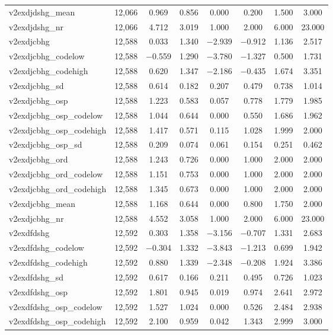 \begin{table}[!htbp]
\begin{tabular}{@{\extracolsep{5pt}}lccccccc}
v2exdjdshg\_mean & 12,066 & 0.969 & 0.856 & 0.000 & 0.200 & 1.500 & 3.000 \\ 
v2exdjdshg\_nr & 12,066 & 4.712 & 3.019 & 1.000 & 2.000 & 6.000 & 23.000 \\ 
v2exdjcbhg & 12,588 & 0.033 & 1.340 & $-$2.939 & $-$0.912 & 1.136 & 2.517 \\ 
v2exdjcbhg\_codelow & 12,588 & $-$0.559 & 1.290 & $-$3.780 & $-$1.327 & 0.500 & 1.731 \\ 
v2exdjcbhg\_codehigh & 12,588 & 0.620 & 1.347 & $-$2.186 & $-$0.435 & 1.674 & 3.351 \\ 
v2exdjcbhg\_sd & 12,588 & 0.614 & 0.182 & 0.207 & 0.479 & 0.738 & 1.014 \\ 
v2exdjcbhg\_osp & 12,588 & 1.223 & 0.583 & 0.057 & 0.778 & 1.779 & 1.985 \\ 
v2exdjcbhg\_osp\_codelow & 12,588 & 1.044 & 0.644 & 0.000 & 0.550 & 1.686 & 1.962 \\ 
v2exdjcbhg\_osp\_codehigh & 12,588 & 1.417 & 0.571 & 0.115 & 1.028 & 1.999 & 2.000 \\ 
v2exdjcbhg\_osp\_sd & 12,588 & 0.209 & 0.074 & 0.061 & 0.154 & 0.251 & 0.462 \\ 
v2exdjcbhg\_ord & 12,588 & 1.243 & 0.726 & 0.000 & 1.000 & 2.000 & 2.000 \\ 
v2exdjcbhg\_ord\_codelow & 12,588 & 1.151 & 0.753 & 0.000 & 1.000 & 2.000 & 2.000 \\ 
v2exdjcbhg\_ord\_codehigh & 12,588 & 1.345 & 0.673 & 0.000 & 1.000 & 2.000 & 2.000 \\ 
v2exdjcbhg\_mean & 12,588 & 1.168 & 0.644 & 0.000 & 0.800 & 1.750 & 2.000 \\ 
v2exdjcbhg\_nr & 12,588 & 4.552 & 3.058 & 1.000 & 2.000 & 6.000 & 23.000 \\ 
v2exdfdshg & 12,592 & 0.303 & 1.358 & $-$3.156 & $-$0.707 & 1.331 & 2.683 \\ 
v2exdfdshg\_codelow & 12,592 & $-$0.304 & 1.332 & $-$3.843 & $-$1.213 & 0.699 & 1.942 \\ 
v2exdfdshg\_codehigh & 12,592 & 0.880 & 1.339 & $-$2.348 & $-$0.208 & 1.924 & 3.386 \\ 
v2exdfdshg\_sd & 12,592 & 0.617 & 0.166 & 0.211 & 0.495 & 0.726 & 1.023 \\ 
v2exdfdshg\_osp & 12,592 & 1.801 & 0.945 & 0.019 & 0.974 & 2.641 & 2.972 \\ 
v2exdfdshg\_osp\_codelow & 12,592 & 1.527 & 1.024 & 0.000 & 0.526 & 2.484 & 2.938 \\ 
v2exdfdshg\_osp\_codehigh & 12,592 & 2.100 & 0.959 & 0.042 & 1.343 & 2.999 & 3.000 \\ 

\end{tabular}
\end{table}
